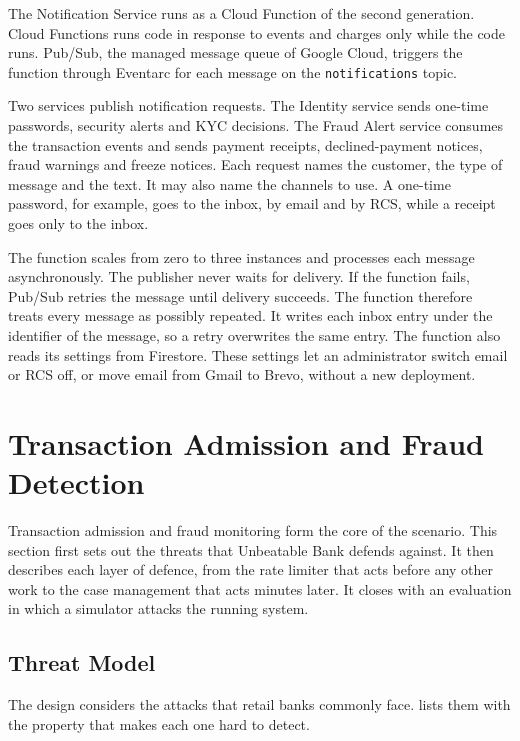 \documentclass[11pt,a4paper]{article}
\newcommand{\project}{Unbeatable Bank}
\newcommand{\code}[1]{\texttt{#1}}
\begin{document}
The Notification Service runs as a Cloud Function of the second generation. Cloud Functions runs code in response to events and charges only while the code runs. Pub/Sub, the managed message queue of Google Cloud, triggers the function through Eventarc for each message on the \code{notifications} topic.

Two services publish notification requests. The Identity service sends one-time passwords, security alerts and KYC decisions. The Fraud Alert service consumes the transaction events and sends payment receipts, declined-payment notices, fraud warnings and freeze notices. Each request names the customer, the type of message and the text. It may also name the channels to use. A one-time password, for example, goes to the inbox, by email and by RCS, while a receipt goes only to the inbox.

The function scales from zero to three instances and processes each message asynchronously. The publisher never waits for delivery. If the function fails, Pub/Sub retries the message until delivery succeeds. The function therefore treats every message as possibly repeated. It writes each inbox entry under the identifier of the message, so a retry overwrites the same entry. The function also reads its settings from Firestore. These settings let an administrator switch email or RCS off, or move email from Gmail to Brevo, without a new deployment.

\section{Transaction Admission and Fraud Detection}
\label{sec:fraud}

Transaction admission and fraud monitoring form the core of the scenario. This section first sets out the threats that \project{} defends against. It then describes each layer of defence, from the rate limiter that acts before any other work to the case management that acts minutes later. It closes with an evaluation in which a simulator attacks the running system.

\subsection{Threat Model}
\label{sec:threats}

The design considers the attacks that retail banks commonly face.  lists them with the property that makes each one hard to detect.
\end{document}
